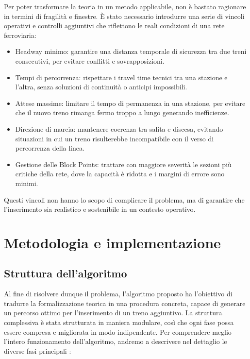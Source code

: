 \documentclass{report}
\begin{document}
Per poter trasformare la teoria in un metodo applicabile, non è bastato ragionare in termini di fragilità e finestre. È stato necessario introdurre una serie di vincoli operativi e controlli aggiuntivi che riflettono le reali condizioni di una rete ferroviaria:
\begin{itemize}

\item Headway minimo: garantire una distanza temporale di sicurezza tra due treni consecutivi, per evitare conflitti e sovrapposizioni.

\item Tempi di percorrenza: rispettare i travel time tecnici tra una stazione e l’altra, senza soluzioni di continuità o anticipi impossibili.

\item Attese massime: limitare il tempo di permanenza in una stazione, per evitare che il nuovo treno rimanga fermo troppo a lungo generando inefficienze.

\item Direzione di marcia: mantenere coerenza tra salita e discesa, evitando situazioni in cui un treno risulterebbe incompatibile con il verso di percorrenza della linea.

\item Gestione delle Block Points: trattare con maggiore severità le sezioni più critiche della rete, dove la capacità è ridotta e i margini di errore sono minimi.

\end{itemize}
Questi vincoli non hanno lo scopo di complicare il problema, ma di garantire che l’inserimento sia realistico e sostenibile in un contesto operativo.





\chapter{Metodologia e implementazione}
\section{Struttura dell’algoritmo}

Al fine di risolvere dunque il problema, l'algoritmo proposto ha l'obiettivo di tradurre la formalizzazione teorica in una procedura concreta, capace di generare un percorso ottimo per l’inserimento di un treno aggiuntivo. La struttura complessiva è stata strutturata in maniera modulare, così che ogni fase possa essere compresa e migliorata in modo indipendente.
Per comprendere meglio l’intero funzionamento dell'algoritmo, andremo a descrivere nel dettaglio le diverse fasi principali : 
\end{document}
